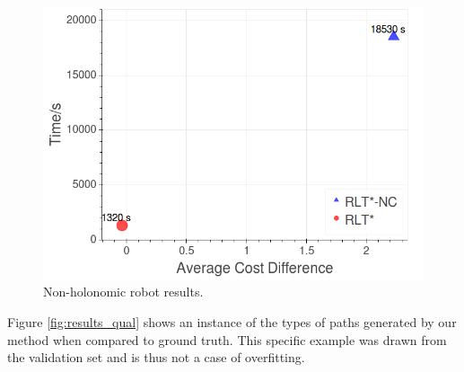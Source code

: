 \documentclass[a4paper,11pt]{report}
\begin{document}
  	\begin{figure}[tbh]
	\centering
	\captionsetup[subfigure]{justification=centering}
	\hspace{-1cm}
    \includegraphics[scale=0.2]{figures/pareto_front_kino.png}

    \caption{Non-holonomic robot results.}
    \vspace{-2mm}
  \label{fig:results_kino}
  \end{figure}

Figure \ref{fig:results_qual} shows an instance of the types of paths generated by our method when compared to ground truth. This specific example was drawn from the validation set and is thus not a case of overfitting.
\end{document}

